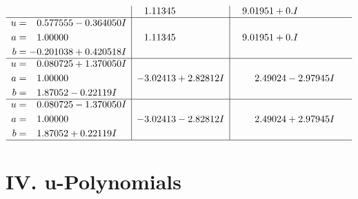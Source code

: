 \documentclass[1p]{elsarticle_modified}
\theoremstyle{definition}
\begin{document}
$$\begin{array}{c|c|c}
 & \phantom{-}1.11345\phantom{ +0.000000I} & \phantom{-}9.01951 + 0. I\phantom{ +0.000000I} \\ \hline\begin{aligned}
u &= \phantom{-}0.577555 - 0.364050 I \\
a &= \phantom{-}1.00000\phantom{ +0.000000I} \\
b &= -0.201038 + 0.420518 I\end{aligned}
 & \phantom{-}1.11345\phantom{ +0.000000I} & \phantom{-}9.01951 + 0. I\phantom{ +0.000000I} \\ \hline\begin{aligned}
u &= \phantom{-}0.080725 + 1.370050 I \\
a &= \phantom{-}1.00000\phantom{ +0.000000I} \\
b &= \phantom{-}1.87052 - 0.22119 I\end{aligned}
 & -3.02413 + 2.82812 I & \phantom{-}2.49024 - 2.97945 I \\ \hline\begin{aligned}
u &= \phantom{-}0.080725 - 1.370050 I \\
a &= \phantom{-}1.00000\phantom{ +0.000000I} \\
b &= \phantom{-}1.87052 + 0.22119 I\end{aligned}
 & -3.02413 - 2.82812 I & \phantom{-}2.49024 + 2.97945 I\\
 \hline 
 \end{array}$$\newpage
\newpage\renewcommand{\arraystretch}{1}
\centering \section*{ IV. u-Polynomials}
\end{document}
